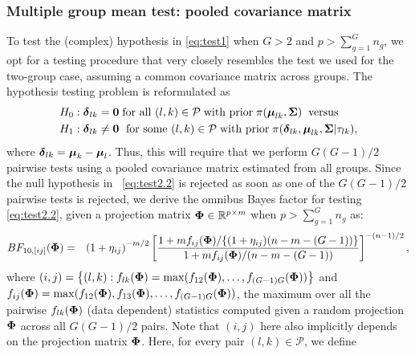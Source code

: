 \documentclass[pdflatex,sn-basic]{sn-jnl}%
\newcommand{\uzero}            {\mbox{\boldmath$0$}}
\def\be{\begin{eqnarray}}
\def\ee{\end{eqnarray}}
\newcommand{\udelta}            {\mbox{\boldmath$\delta$}}
\newcommand{\umu}               {\mbox{\boldmath$\mu$}}
\newcommand{\uSigma}            {\mbox{\boldmath$\Sigma$}}
\newcommand{\uPhi}              {\mbox{\boldmath$\Phi$}}
\theoremstyle{thmstyleone}%
\theoremstyle{thmstyletwo}%
\theoremstyle{thmstylethree}%
\begin{document}
\subsubsection{Multiple group mean test: pooled covariance matrix} \label{sec:testpl}
To test the (complex) hypothesis in \eqref{eq:test1} when $G > 2$ and $p > \sum^{G}_{g=1}n_g$, we opt for a testing procedure that very closely resembles the test we used for the two-group case, assuming a common covariance matrix across groups. The hypothesis testing problem is reformulated as
\be
\begin{split}
H_{0}&:
\udelta_{lk} = \uzero \; \mbox{for all }(l, k)\in\mathcal{P}
\;\mbox{with prior}\; \pi(\umu_{lk},\uSigma)\;\; \mbox{versus} \;\; \\  H_{1} &:
\udelta_{lk} \neq \uzero \; \mbox{ for some }(l, k)\in\mathcal{P}
\; \mbox{with prior} \; \pi(\udelta_{lk},\umu_{lk},\uSigma | \tau_{lk}),  \label{eq:test2.2}
\end{split}
\ee
where $\udelta_{lk} = \umu_k - \umu_l$. 
Thus, this will require that we perform $G(G-1)/2$ pairwise tests using a pooled covariance matrix estimated from all groups. Since the null hypothesis in ~\eqref{eq:test2.2} is rejected as soon as one of the $G(G-1)/2$ pairwise tests is rejected, we derive the omnibus Bayes factor for testing \eqref{eq:test2.2}, given a projection matrix $\uPhi \in \mathbb{R}^{p \times m}$ when $p > \sum^{G}_{g=1}n_g$ as:
\be
BF_{10,[ij]}(\uPhi) &=& \left(1 + \eta_{ij} \right)^{-m/2} \left[ \frac{  1 + {m f_{ij}(\uPhi)}/\{(1 + \eta_{ij})(n-m-(G-1))\}}{ 1 + {m f_{ij}(\uPhi)}/{(n-m-(G-1))}  } \right]^{-(n-1)/2}, \label{eq:BFmax}
\ee
where $(i, j) = \left\{(l, k) : f_{lk}(\uPhi) = \max(f_{12}(\uPhi), \ldots, f_{(G-1)G}(\uPhi) )  \right\}$ and $f_{ij}
(\uPhi) = \max(f_{12}(\uPhi), f_{13}(\uPhi), \ldots, f_{(G-1)G}(\uPhi) )$, 
the maximum over all the pairwise $f_{lk}(\uPhi)$ (data dependent) statistics computed given a random projection $\uPhi$ across all $G(G-1)/2$ pairs. Note that $(i, j)$ here also implicitly depends on the projection matrix $\uPhi$. Here, for every pair $(l,k)\in\mathcal{P}$, we define  
\end{document}
